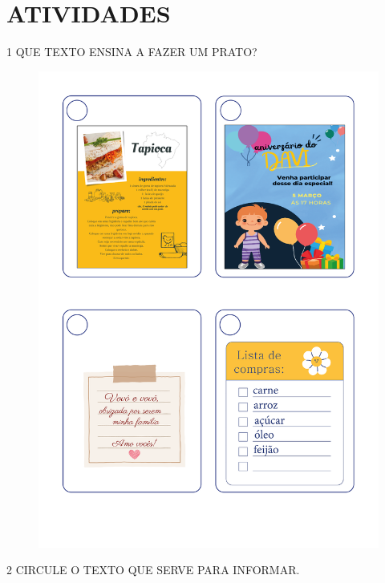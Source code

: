 \section*{ATIVIDADES}

\num{1} QUE TEXTO ENSINA A FAZER UM PRATO? 

\begin{figure}[H]
\centering
\includegraphics[width=.95\textwidth]{media/image137a140.png}
\end{figure}

\num{2} CIRCULE O TEXTO QUE SERVE PARA INFORMAR. 

